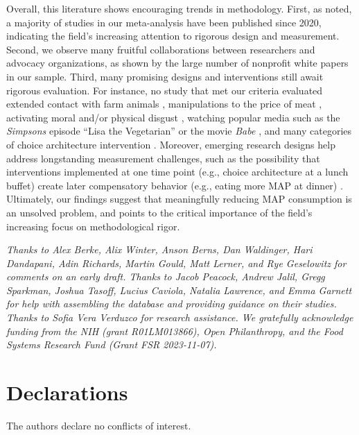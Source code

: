 \documentclass[sn-nature,referee,lineno,pdflatex]{sn-jnl}
\begin{document}
Overall, this literature shows encouraging trends in methodology. First,
as noted, a majority of studies in our meta-analysis have been published
since 2020, indicating the field's increasing attention to rigorous
design and measurement. Second, we observe many fruitful collaborations
between researchers and advocacy organizations, as shown by the large
number of nonprofit white papers in our sample. Third, many promising
designs and interventions still await rigorous evaluation. For instance,
no study that met our criteria evaluated extended contact with farm
animals \citep{cerrato2022}, manipulations to the price of meat
\citep{wilde2016}, activating moral and/or physical disgust
\citep{palomo2018}, watching popular media such as the \emph{Simpsons}
episode ``Lisa the Vegetarian'' \citep{byrd2010} or the movie
\emph{Babe} \citep{novatna2019}, and many categories of choice
architecture intervention \citep{olafsson2024}. Moreover, emerging
research designs help address longstanding measurement challenges, such
as the possibility that interventions implemented at one time point
(e.g., choice architecture at a lunch buffet) create later compensatory
behavior (e.g., eating more MAP at dinner) \citep{vocski2024}.
Ultimately, our findings suggest that meaningfully reducing MAP
consumption is an unsolved problem, and points to the critical
importance of the field's increasing focus on methodological rigor.


\emph{Thanks to Alex Berke, Alix Winter, Anson Berns, Dan Waldinger,
Hari Dandapani, Adin Richards, Martin Gould, Matt Lerner, and Rye
Geselowitz for comments on an early draft. Thanks to Jacob Peacock,
Andrew Jalil, Gregg Sparkman, Joshua Tasoff, Lucius Caviola, Natalia
Lawrence, and Emma Garnett for help with assembling the database and
providing guidance on their studies. Thanks to Sofia Vera Verduzco for
research assistance. We gratefully acknowledge funding from the NIH
(grant R01LM013866), Open Philanthropy, and the Food Systems Research
Fund (Grant FSR 2023-11-07).}

\section*{Declarations}\label{declarations}

The authors declare no conflicts of interest. \newpage

\renewcommand\refname{References}

\end{document}
